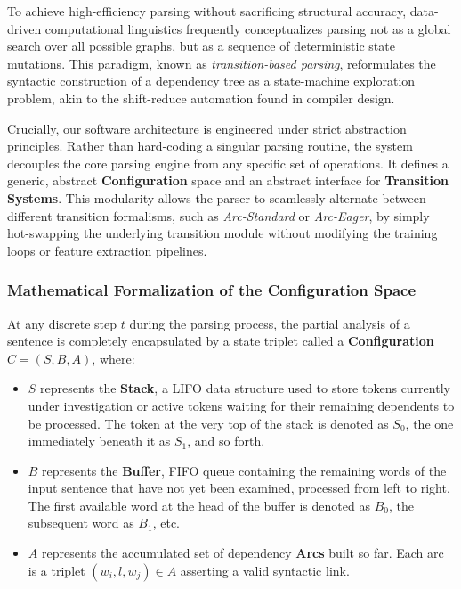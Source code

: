 \documentclass[12pt,a4paper]{article}
\begin{document}
To achieve high-efficiency parsing without sacrificing structural accuracy, data-driven computational linguistics frequently conceptualizes parsing not as a global search over all possible graphs, but as a sequence of deterministic state mutations. This paradigm, known as \textit{transition-based parsing}, reformulates the syntactic construction of a dependency tree as a state-machine exploration problem, akin to the shift-reduce automation found in compiler design. 

Crucially, our software architecture is engineered under strict abstraction principles. Rather than hard-coding a singular parsing routine, the system decouples the core parsing engine from any specific set of operations. It defines a generic, abstract \textbf{Configuration} space and an abstract interface for \textbf{Transition Systems}. This modularity allows the parser to seamlessly alternate between different transition formalisms, such as \textit{Arc-Standard} or \textit{Arc-Eager}, by simply hot-swapping the underlying transition module without modifying the training loops or feature extraction pipelines.

\subsubsection{Mathematical Formalization of the Configuration Space}

At any discrete step $t$ during the parsing process, the partial analysis of a sentence is completely encapsulated by a state triplet called a \textbf{Configuration} $C = (S, B, A)$, where:
\begin{itemize}
    \item $S$ represents the \textbf{Stack}, a LIFO data structure used to store tokens currently under investigation or active tokens waiting for their remaining dependents to be processed. The token at the very top of the stack is denoted as $S_0$, the one immediately beneath it as $S_1$, and so forth.
    \item $B$ represents the \textbf{Buffer}, FIFO queue containing the remaining words of the input sentence that have not yet been examined, processed from left to right. The first available word at the head of the buffer is denoted as $B_0$, the subsequent word as $B_1$, etc.
    \item $A$ represents the accumulated set of dependency \textbf{Arcs} built so far. Each arc is a triplet $(w_i, l, w_j) \in A$ asserting a valid syntactic link.
\end{itemize}
\end{document}

